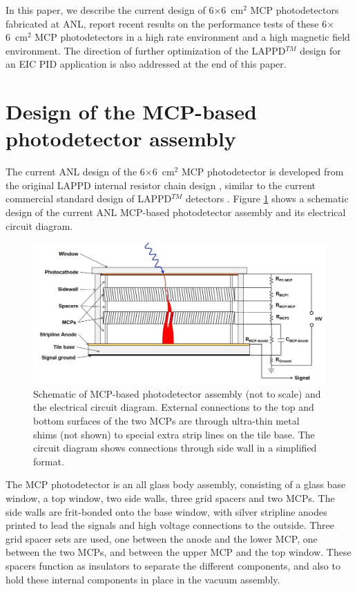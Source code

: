 \documentclass[preprint,5p]{elsarticle}
\begin{document}
In this paper, we describe the current design of 6$\times$6~cm$^2$ MCP 
photodetectors fabricated at ANL, report recent results on the performance 
tests of these 6$\times$6~cm$^2$ MCP photodetectors in a high rate environment 
and a high magnetic field environment. The direction of further optimization of 
the LAPPD$^{TM}$ design for an EIC PID application is also addressed at the end 
of this paper.


\section{Design of the MCP-based photodetector assembly} \label{sec_design}
The current ANL design of the 6$\times$6~cm$^2$ MCP photodetector is developed 
from the original LAPPD internal resistor chain design \cite{Wang-MCPs2}, 
similar to the current commercial standard design of LAPPD$^{TM}$ detectors 
\cite{Craven-MCPs}. Figure \ref{fig:design} shows a schematic design of the 
current ANL MCP-based photodetector assembly and its electrical circuit 
diagram.  

\begin{figure}[tbp]
\centering 
\includegraphics[scale=0.21]{fig/MCPs_design.png}
\caption{Schematic of MCP-based photodetector assembly (not to scale) and the 
   electrical circuit diagram. External connections to the top and bottom 
surfaces of the two MCPs are through ultra-thin metal shims (not shown) to 
special extra strip lines on the tile base. The circuit diagram shows 
connections through side wall in a simplified format.} 
\label{fig:design}
\end{figure}

The MCP photodetector is an all glass body assembly, consisting of a glass base 
window, a top window, two side walls, three grid spacers and two MCPs. The side 
walls are frit-bonded onto the base window, with silver stripline anodes 
printed to lead the signals and high voltage connections to the outside. Three 
grid spacer sets are used, one between the anode and the lower MCP, one between 
the two MCPs, and between the upper MCP and the top window. These spacers 
function as insulators to separate the different components, and also to hold 
these internal components in place in the vacuum assembly. 
\end{document}

